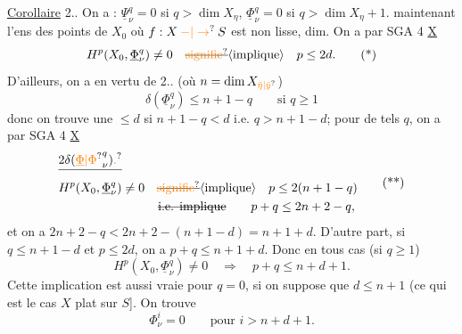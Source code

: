 \uline{Corollaire} 2.. On a : $\underline\Psi^q_\nu=0$ si $q>\dim X_\eta$, $\underline\Phi^q_\nu=0$ si $q>\dim X_\eta+1$.
   maintenant  l'ens  des points de $X_0$ où $f:X\mathbin{\unsure{-|\to}}S$ est non lisse,   dim. 
On a   par SGA 4  \uline{X}
\[
H^p(X_0,\underline\Phi^q_\nu)\ne0\quad\deleted{\text{\unsure{signifie}}}\inserted{\text{implique}}\quad p\leq2d.
\tag*{(*)}
\]
D'ailleurs, on a en vertu de 2.. (où $n=\dim X_{\unsure{\bar\eta|\bar y}}$)
\[
\delta(\underline\Phi^q_\nu)\leq n+1-q\qquad\text{si }q\geq1
\]
donc on trouve une   $\leq d$ si $n+1-q<d$ i.e. $q>n+1-d$;  pour de tels $q$, on a par SGA 4 \uline{X}
\[
\begin{aligned}
&\deleted{2\delta({\unsure{\underline\Phi|\Phi}}^q_\nu)\unsure{.}}\\
&H^p(X_0,\underline\Phi^q_\nu)\ne0\quad\deleted{\text{\unsure{signifie}}}\inserted{\text{implique}}\quad p\leq2(n+1-q)\\
&\hspace{8em}\deleted{\text{i.e. implique}}\qquad p+q\leq2n+2-q,
\end{aligned}
\tag*{(**)}
\]
et on a  $2n+2-q<2n+2-(n+1-d)=n+1+d$. 
D'autre part, si $q\leq n+1-d$ et  $p\leq2d$, on a $p+q\leq n+1+d$. Donc en tous cas (si $q\geq1$)
\[
H^p(X_0,\underline\Phi^q_\nu)\ne0\quad\Longrightarrow\quad p+q\leq n+d+1.
\]
 Cette implication est aussi vraie pour $q=0$, si on suppose que $d\leq n+1$ (ce qui est le cas    $X$ plat sur $S$]. On trouve 
\[
\Phi^i_\nu=0\qquad\text{pour }i>n+d+1.
\]

